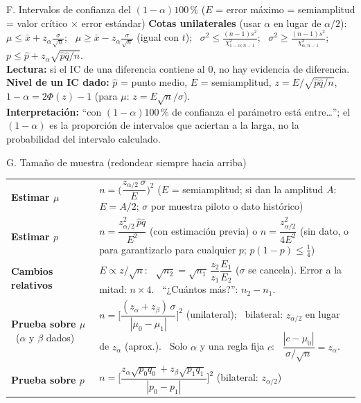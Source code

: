 \documentclass[10pt,a4paper]{extarticle}
\newcommand{\xb}{\bar{x}}
\newcommand{\chis}{\chi^2}
\newcommand{\sq}[1]{\sqrt{#1}}
\begin{document}
\begin{hoja}{F. Intervalos de confianza del $(1-\alpha)100\,\%$ \quad ($E$ = error máximo = semiamplitud = valor crítico $\times$ error estándar)}
\smallskip
\textbf{Cotas unilaterales} (usar $\alpha$ en lugar de $\alpha/2$): \ $\mu\le\xb+z_\alpha\frac\sigma{\sq n}$; \ $\mu\ge\xb-z_\alpha\frac\sigma{\sq n}$ (igual con $t$); \ $\sigma^2\le\frac{(n-1)s^2}{\chis_{1-\alpha;n-1}}$; \ $\sigma^2\ge\frac{(n-1)s^2}{\chis_{\alpha;n-1}}$; \ $p\le\hat p+z_\alpha\sq{\hat p\hat q/n}$.\\
\textbf{Lectura:} si el IC de una diferencia contiene al 0, no hay evidencia de diferencia. \textbf{Nivel de un IC dado:} $\hat p$ = punto medio, $E$ = semiamplitud, $z=E\big/\sq{\hat p\hat q/n}$, \ $1-\alpha=2\Phi(z)-1$ (para $\mu$: $z=E\sq n/\sigma$).\\
\textbf{Interpretación:} ``con $(1-\alpha)100\,\%$ de confianza el parámetro está entre\ldots''; el $(1-\alpha)$ es la proporción de intervalos que aciertan a la larga, no la probabilidad del intervalo calculado.
\end{hoja}

\begin{hoja}{G. Tamaño de muestra (redondear siempre hacia arriba)}
\renewcommand{\arraystretch}{1.6}
\begin{tabular}{@{}>{\raggedright\arraybackslash}p{3.6cm}>{\raggedright\arraybackslash}p{14.2cm}@{}}
\textbf{Estimar $\mu$} & $n=\Big(\dfrac{z_{\alpha/2}\,\sigma}{E}\Big)^2$ \quad ($E$ = semiamplitud; si dan la amplitud $A$: $E=A/2$; $\sigma$ por muestra piloto o dato histórico)\\
\textbf{Estimar $p$} & $n=\dfrac{z_{\alpha/2}^2\,\hat p\hat q}{E^2}$ (con estimación previa) \quad o \quad $n=\dfrac{z_{\alpha/2}^2}{4E^2}$ (sin dato, o para garantizarlo para cualquier $p$; $p(1-p)\le\frac14$)\\
\textbf{Cambios relativos} & $E\propto z/\sq n$: \ $\sqrt{n_2}=\sqrt{n_1}\,\dfrac{z_2}{z_1}\dfrac{E_1}{E_2}$ ($\sigma$ se cancela). Error a la mitad: $n\times4$. \ ``¿Cuántos más?'': $n_2-n_1$.\\
\textbf{Prueba sobre $\mu$} \ ($\alpha$ y $\beta$ dados) & $n=\Big[\dfrac{(z_\alpha+z_\beta)\,\sigma}{|\mu_0-\mu_1|}\Big]^2$ (unilateral); \ bilateral: $z_{\alpha/2}$ en lugar de $z_\alpha$ (aprox.). \ Solo $\alpha$ y una regla fija $c$: \ $\dfrac{|c-\mu_0|}{\sigma/\sq n}=z_\alpha$.\\
\textbf{Prueba sobre $p$} & $n=\Big[\dfrac{z_\alpha\sq{p_0q_0}+z_\beta\sq{p_1q_1}}{|p_0-p_1|}\Big]^2$ \quad (bilateral: $z_{\alpha/2}$)\\
\end{tabular}
\end{hoja}
\end{document}
